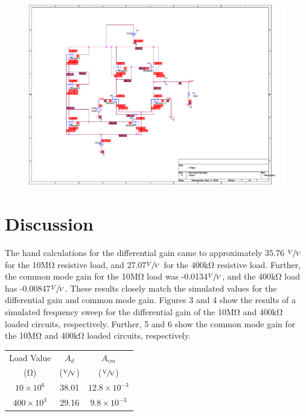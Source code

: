 \documentclass{article}
\begin{document}
\begin{figure}[H]
	\hspace{-3em}\includegraphics[scale=0.5]{pic1.pdf}
\end{figure}


\section{Discussion}

The hand calculations for the differential gain came to approximately 35.76 $\sfrac{V}{V}$ for the 10$\si{\mega\ohm}$ resistive load, and 27.07$\sfrac{V}{V}$ for the 400$\si{\kilo\ohm}$ resistive load. Further, the common mode gain for the 10$\si{\mega\ohm}$ load was -0.0134$\sfrac{V}{V}$, and the 400$\si{\kilo\ohm}$ load has -0.00847$\sfrac{V}{V}$. These results closely match the simulated values for the differential gain and common mode gain. Figures 3 and 4 show the results of a simulated frequency sweep for the differential gain of the 10$\si{\mega\ohm}$ and 400$\si{\kilo\ohm}$ loaded circuits, respectively. Further, 5 and 6 show the common mode gain for the 10$\si{\mega\ohm}$ and 400$\si{\kilo\ohm}$ loaded circuits, respectively.\\

\begin{table}[H]
	\centering
	\begin{tabular}{S[table-format=3.2] S[table-format=3.2] S[table-format=3.2]}
		\toprule
		{Load Value} 	& {$A_d$} & {$A_{cm}$}\\
		{($\si{\ohm}$)}	& {($\sfrac{\si{\volt}}{\si{\volt}}$)} & {($\sfrac{\si{\volt}}{\si{\volt}}$)}\\
		\midrule
		{$10 \times 10^6$}	&	38.01	&	{$12.8 \times 10^{-3}$}\\
		{$400 \times 10^3$}	&	29.16	&	{$9.8 \times 10^{-3}$}\\
		\bottomrule
	\end{tabular}
\end{table}
\end{document}
